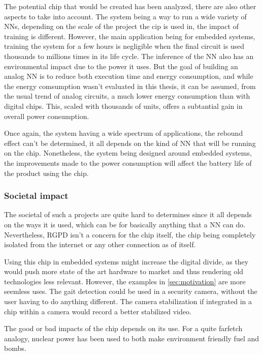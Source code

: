 The potential chip that would be created has been analyzed, there are also other aspects to take into account. The system being a way to run a wide variety of \acp{NN}, depending on the scale of the project the cip is used in, the impact of training is different. However, the main application being for embedded systems, training the system for a few hours is negligible when the final circuit is used thousands to millions times in its life cycle.
The inference of the \ac{NN} also has an environmental impact due to the power it uses. But the goal of building an analog \ac{NN} is to reduce both execution time and energy consumption, and while the energy comsumption wasn't evaluated in this thesis, it can be assumed, from the usual trend of analog circuits, a much lower energy consumption than with digital chips. This, scaled with thousands of units, offers a subtantial gain in overall power consumption.

Once again, the system having a wide spectrum of applications, the rebound effect can't be determined, it all depends on the kind of \ac{NN} that will be running on the chip. Nonetheless, the system being designed around embedded systems, the improvements made to the power consumption will affect the battery life of the product using the chip.

\subsubsection{Societal impact}

The societal of such a projects are quite hard to determines since it all depends on the ways it is used, which can be for basically anything that a \ac{NN} can do. Nevertheless, RGPD isn't a concern for the chip itself, the chip being completely isolated from the internet or any other connection as of itself.

Using this chip in embedded systems might increase the digital divide, as they would push more state of the art hardware to market and thus rendering old technologies less relevant. However, the examples in \cref{sec:motivation} are more seemless uses. The gait detection \cite{gaitDS,gaitDig,gait} could be used in a security camera, without the user having to do anything different. The camera stabilization \cite{videoStab} if integrated in a chip within a camera would record a better stabilized video.

The good or bad impacts of the chip depends on its use. For a quite farfetch analogy, nuclear power has been used to both make environment friendly fuel and bombs.

